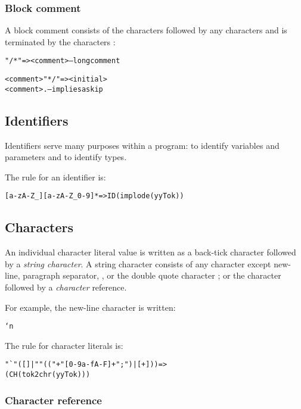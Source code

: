\subsubsection{Block comment}
\label{token:blockcomment}
A block comment consists of the characters \constant{/*} followed by any characters and is terminated by the characters \constant{*/}:
\begin{alltt}
"/*" => <comment>       -- long comment

<comment> "*/" => <initial>
<comment> .             -- implies a skip
\end{alltt}

\subsection{Identifiers}
\label{token:identifier}
Identifiers serve many purposes within a \go program: to identify variables and parameters and to identify types. 

The  rule for an identifier is:
\begin{alltt}
[a-zA-Z_][a-zA-Z_0-9]* => ID(implode(yyTok))
\end{alltt}

\subsection{Characters}
\label{token:char}

An individual character literal value is written as a back-tick character  followed by a \emph{string character}. A string character consists of any character except new-line, paragraph separator, , or the double quote character ; or the \constant{\bsl} character followed by a \emph{character} reference.

For example, the new-line character is written:
\begin{alltt}
`\bsl{}n
\end{alltt}

The  rule for character literals is:

\begin{alltt}
"`"([\uphat\bsl\bsl]|"\bsl\bsl"(("+"[0-9a-fA-F]+";")|[\uphat+])) =>
(CH(tok2chr(yyTok)))
\end{alltt}

\subsubsection{Character reference}
\label{token:stringcharacter}
  
